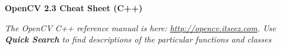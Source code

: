 \documentclass[10pt,landscape]{article}
\makeatletter
\renewcommand{\section}{\@startsection{section}{1}{0mm}%
                                {-1ex plus -.5ex minus -.2ex}%
                                {0.5ex plus .2ex}%
                                {\normalfont\large\bfseries}}
\makeatother
\begin{document}
\raggedright
\footnotesize
\begin{multicols}{3}


\setlength{\premulticols}{1pt}
\setlength{\postmulticols}{1pt}
\setlength{\multicolsep}{1pt}
\setlength{\columnsep}{2pt}

\begin{center}
     \Large{\textbf{OpenCV 2.3 Cheat Sheet (C++)}} \\
\end{center}
\newlength{\MyLen}


\emph{The OpenCV C++ reference manual is here: \url{http://opencv.itseez.com}. Use \textbf{Quick Search} to find descriptions of the particular functions and classes}


\end{multicols}
\end{document}

